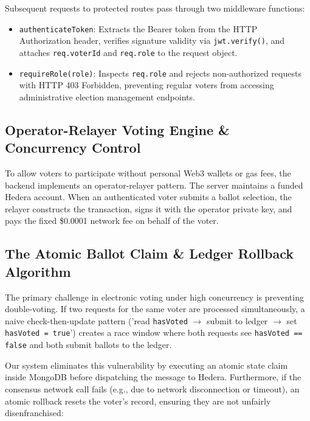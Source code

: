 \documentclass[12pt, a4paper]{article}
\begin{document}
Subsequent requests to protected routes pass through two middleware functions:
\begin{itemize}
    \item \texttt{authenticateToken}: Extracts the Bearer token from the HTTP Authorization header, verifies signature validity via \texttt{jwt.verify()}, and attaches \texttt{req.voterId} and \texttt{req.role} to the request object.
    \item \texttt{requireRole(role)}: Inspects \texttt{req.role} and rejects non-authorized requests with HTTP 403 Forbidden, preventing regular voters from accessing administrative election management endpoints.
\end{itemize}

\subsection{Operator-Relayer Voting Engine \& Concurrency Control}
To allow voters to participate without personal Web3 wallets or gas fees, the backend implements an operator-relayer pattern. The server maintains a funded Hedera account. When an authenticated voter submits a ballot selection, the relayer constructs the transaction, signs it with the operator private key, and pays the fixed \$0.0001 network fee on behalf of the voter.

\subsection{The Atomic Ballot Claim \& Ledger Rollback Algorithm}
The primary challenge in electronic voting under high concurrency is preventing double-voting. If two requests for the same voter are processed simultaneously, a naive check-then-update pattern ('read \texttt{hasVoted} $\rightarrow$ submit to ledger $\rightarrow$ set \texttt{hasVoted = true}') creates a race window where both requests see \texttt{hasVoted == false} and both submit ballots to the ledger.

Our system eliminates this vulnerability by executing an atomic state claim inside MongoDB before dispatching the message to Hedera. Furthermore, if the consensus network call fails (e.g., due to network disconnection or timeout), an atomic rollback resets the voter's record, ensuring they are not unfairly disenfranchised:
\end{document}
